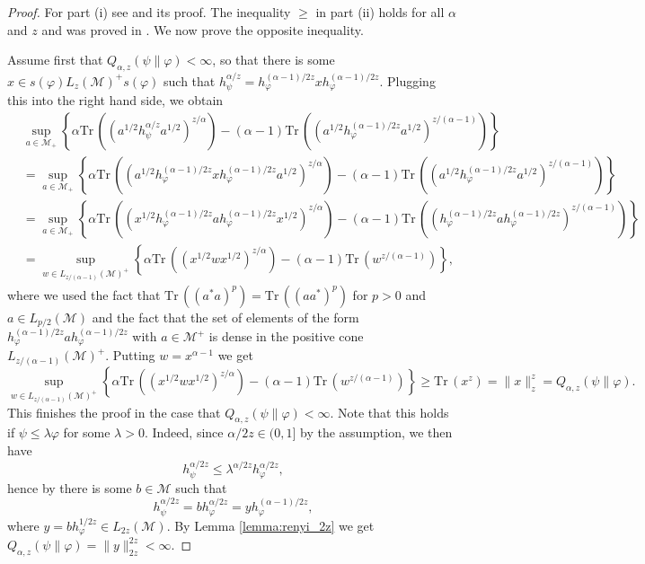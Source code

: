 \documentclass[12pt]{article}
\theoremstyle{definition}
\theoremstyle{remark}
\def\Me{\mathcal M}
\def \Tr{\mathrm{Tr}\,}
\begin{document}
\begin{proof} For part (i) see \cite[Theorem 1 (vi)]{kato2023onrenyi} and its proof. The
inequality $\ge$ in part (ii) holds for all $\alpha$ and $z$ and was proved in
\cite[Theorem 2 (vi)]{kato2023onrenyi}. We now prove the opposite inequality. 

Assume first that $Q_{\alpha,z}(\psi\|\varphi)<\infty$, so that there is some $x\in
s(\varphi)L_z(\Me)^+s(\varphi)$ such that
$h_\psi^{\alpha/z}=h_\varphi^{(\alpha-1)/2z}xh_\varphi^{(\alpha-1)/2z}$. Plugging this
into the right hand side, we obtain
\begin{align*}
&\sup_{a\in \Me_+} \left\{\alpha
\Tr\left((a^{1/2}h_\psi^{\alpha/z}a^{1/2})^{z/\alpha}\right)-(\alpha-1)
\Tr\left((a^{1/2}h_\varphi^{(\alpha-1)/2z}a^{1/2})^{z/(\alpha-1)}\right) \right\}\\
&=\sup_{a\in \Me_+} \left\{\alpha
\Tr\left((a^{1/2}h_\varphi^{(\alpha-1)/2z}xh_\varphi^{(\alpha-1)/2z}    a^{1/2})^{z/\alpha}\right)-(\alpha-1)
\Tr\left((a^{1/2}h_\varphi^{(\alpha-1)/2z}a^{1/2})^{z/(\alpha-1)}\right) \right\}\\
&=\sup_{a\in \Me_+} \left\{\alpha
\Tr\left((x^{1/2}h_\varphi^{(\alpha-1)/2z}ah_\varphi^{(\alpha-1)/2z}    x^{1/2})^{z/\alpha}\right)-(\alpha-1)
\Tr\left((h_\varphi^{(\alpha-1)/2z}a h_\varphi^{(\alpha-1)/2z} )^{z/(\alpha-1)}\right)
\right\}\\
&=\sup_{w\in L_{z/(\alpha-1)}(\Me)^+} \left\{\alpha
\Tr\left((x^{1/2}wx^{1/2})^{z/\alpha}\right)-(\alpha-1)
\Tr\left(w^{z/(\alpha-1)}\right)
\right\},
\end{align*}
where we used the fact that $\Tr \left((a^*a)^p\right)=\Tr \left((aa^*)^p\right)$ for
$p>0$ and $a\in L_{p/2}(\Me)$ and the fact that the set of
elements of the form $h_\varphi^{(\alpha-1)/2z}a h_\varphi^{(\alpha-1)/2z}$ with $a \in
\Me^+$ is dense in the positive cone $L_{z/(\alpha-1)}(\Me)^+$. Putting $w=x^{\alpha-1}$ we
get
\[
\sup_{w\in L_{z/(\alpha-1)}(\Me)^+} \left\{\alpha
\Tr\left((x^{1/2}wx^{1/2})^{z/\alpha}\right)-(\alpha-1)
\Tr\left(w^{z/(\alpha-1)}\right)
\right\}\ge \Tr(x^z)=\|x\|_z^z= Q_{\alpha,z}(\psi\|\varphi).
\]
This finishes the proof in the case that $Q_{\alpha,z}(\psi\|\varphi)<\infty$.  Note that
this holds if $\psi\le \lambda\varphi$ for some $\lambda>0$. Indeed, since
$\alpha/2z\in (0,1]$ by the assumption, we then have 
\[
h_\psi^{\alpha/2z}\le \lambda^{\alpha/2z}h_\varphi^{\alpha/2z},
\]
hence by \cite[Lemma A.58]{hiai2021quantum} there is some $b\in \Me$ such that 
\[
h_\psi^{\alpha/2z}=bh_\varphi^{\alpha/2z}=yh_\varphi^{(\alpha-1)/2z},
\]
where $y=bh_\varphi^{1/2z}\in L_{2z}(\Me)$. By Lemma \ref{lemma:renyi_2z} we get 
$Q_{\alpha,z}(\psi\|\varphi)=\|y\|_{2z}^{2z}<\infty$. 


\end{proof}
\end{document}
